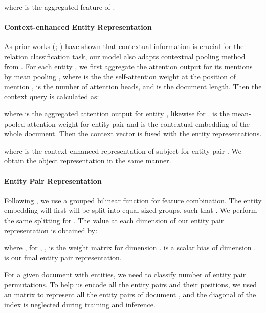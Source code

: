 \documentclass[11pt]{article}
\begin{document}
where  is the aggregated feature of .


\paragraph{Context-enhanced Entity Representation} As prior works (\citealp{xu2021entity}; \citealp{peng2020learning}) have shown that contextual information is crucial for the relation classification task, our model also adapts contextual pooling method from \citet{zhou2021document}. For each entity , we first aggregate the attention output for its mentions by mean pooling , where  is the the self-attention weight at the position of mention ,  is the number of attention heads, and  is the document length. Then the context query is calculated as:


where  is the aggregated attention output for entity , likewise for .  is the mean-pooled attention weight for entity pair  and  is the contextual embedding of the whole document. Then the context vector  is fused with the entity representations.

where  is the context-enhanced representation of subject  for entity pair . We obtain the object representation  in the same manner.

\paragraph{Entity Pair Representation} Following \citet{zhou2021document}, we use a grouped bilinear function for feature combination. The entity embedding  will first will be split into  equal-sized groups, such that . We perform the same splitting for . The value  at each dimension of our entity pair representation is obtained by:

where , for , , is the weight matrix for dimension .  is a scalar bias of dimension .  is our final entity pair representation. 

For a given document  with  entities, we need to classify  number of entity pair permutations. To help us encode all the entity pairs and their positions, we used an  matrix  to represent all the entity pairs of document , and the diagonal of the  index is neglected during training and inference.
\end{document}
